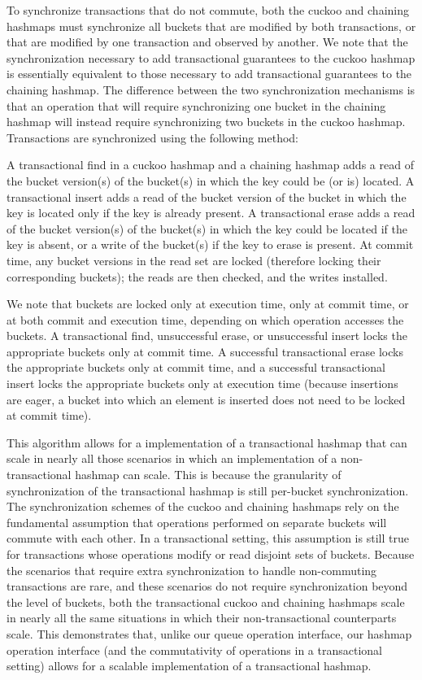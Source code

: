 To synchronize transactions that do not commute, both the cuckoo and chaining hashmaps must synchronize all buckets that are modified by both transactions, or that are modified by one transaction and observed by another. We note that the synchronization necessary to add transactional guarantees to the cuckoo hashmap is essentially equivalent to those necessary to add transactional guarantees to the chaining hashmap. The difference between the two synchronization mechanisms is that an operation that will require synchronizing one bucket in the chaining hashmap will instead require synchronizing two buckets in the cuckoo hashmap. Transactions are synchronized using the following method:

A transactional find in a cuckoo hashmap and a chaining hashmap adds a read of the bucket version(s) of the bucket(s) in which the key could be (or is) located. A transactional insert adds a read of the bucket version of the bucket in which the key is located only if the key is already present. A transactional erase adds a read of the bucket version(s) of the bucket(s) in which the key could be located if the key is absent, or a write of the bucket(s) if the key to erase is present. At commit time, any bucket versions in the read set are locked (therefore locking their corresponding buckets); the reads are then checked, and the writes installed.

We note that buckets are locked only at execution time, only at commit time, or at both commit and execution time, depending on which operation accesses the buckets. A transactional find, unsuccessful erase, or unsuccessful insert locks the appropriate buckets only at commit time. A successful transactional erase locks the appropriate buckets only at commit time, and a successful transactional insert locks the appropriate buckets only at execution time (because insertions are eager, a bucket into which an element is inserted does not need to be locked at commit time).

This algorithm allows for a implementation of a transactional hashmap that can scale in nearly all those scenarios in which an implementation of a non-transactional hashmap can scale. This is because the granularity of synchronization of the transactional hashmap is still per-bucket synchronization. 
The synchronization schemes of the cuckoo and chaining hashmaps rely on the fundamental assumption that operations performed on separate buckets will commute with each other. In a transactional setting, this assumption is still true for transactions whose operations modify or read disjoint sets of buckets. Because the scenarios that require extra synchronization to handle non-commuting transactions are rare, and these scenarios do not require synchronization beyond the level of buckets, both the transactional cuckoo and chaining hashmaps scale in nearly all the same situations in which their non-transactional counterparts scale. 
This demonstrates that, unlike our queue operation interface, our hashmap operation interface (and the commutativity of operations in a transactional setting) allows for a scalable implementation of a transactional hashmap.

